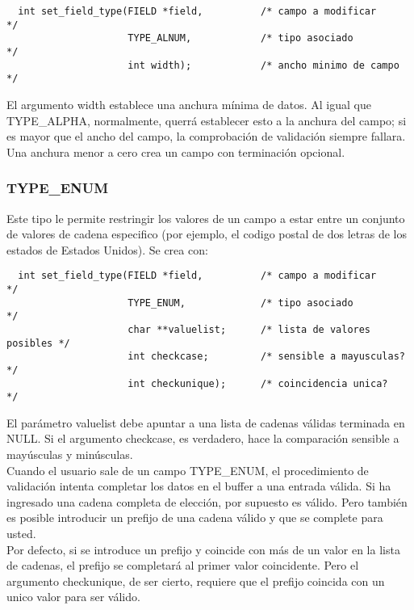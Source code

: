 \documentclass{article}
\begin{document}
\begin{verbatim}
  int set_field_type(FIELD *field,          /* campo a modificar     */
                     TYPE_ALNUM,            /* tipo asociado         */
                     int width);            /* ancho minimo de campo */
\end{verbatim}

El argumento width establece una anchura mínima de datos. Al igual que
TYPE\_ALPHA, normalmente, querrá establecer esto a la anchura del campo; si es
mayor que el ancho del campo, la comprobación de validación siempre fallara.
Una anchura menor a cero crea un campo con terminación opcional.

\subsubsection*{TYPE\_ENUM}%
Este tipo le permite restringir los valores de un campo a estar entre un
conjunto de valores de cadena especifico (por ejemplo, el codigo postal de dos
letras de los estados de Estados Unidos). Se crea con:

\begin{verbatim}
  int set_field_type(FIELD *field,          /* campo a modificar         */
                     TYPE_ENUM,             /* tipo asociado             */
                     char **valuelist;      /* lista de valores posibles */
                     int checkcase;         /* sensible a mayusculas?    */
                     int checkunique);      /* coincidencia unica?       */
\end{verbatim}

El parámetro valuelist debe apuntar a una lista de cadenas válidas terminada en
NULL. Si el argumento checkcase, es verdadero, hace la comparación sensible a
mayúsculas y minúsculas.\\

Cuando el usuario sale de un campo TYPE\_ENUM, el procedimiento de validación
intenta completar los datos en el buffer a una entrada válida. Si ha ingresado
una cadena completa de elección, por supuesto es válido. Pero también es
posible introducir un prefijo de una cadena válido y que se complete para
usted.\\

Por defecto, si se introduce un prefijo y coincide con más de un valor en la
lista de cadenas, el prefijo se completará al primer valor coincidente. Pero el
argumento checkunique, de ser cierto, requiere que el prefijo coincida con un
unico valor para ser válido.\\
\end{document}
